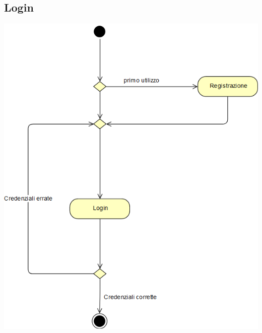 \documentclass[a4paper]{report}
\begin{document}
        \subsection*{Login}
        \begin{center}
                    \includegraphics[scale=0.5]{activity/LoginActivity.png}
        \end{center}
\end{document}
